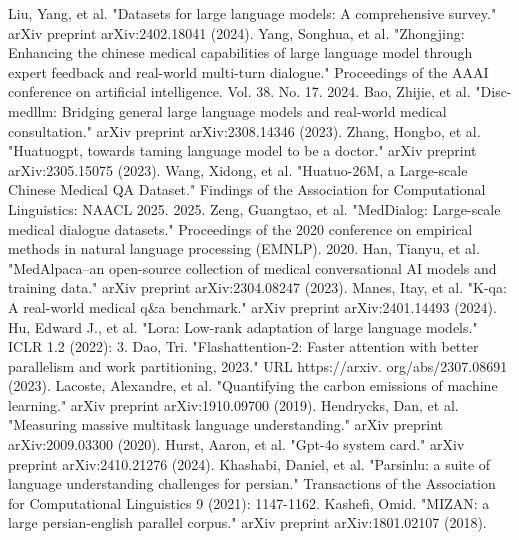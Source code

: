 \documentclass[conference]{IEEEtran}
\begin{document}
\begin{thebibliography}{00}
Liu, Yang, et al. "Datasets for large language models: A comprehensive survey." arXiv preprint arXiv:2402.18041 (2024).
Yang, Songhua, et al. "Zhongjing: Enhancing the chinese medical capabilities of large language model through expert feedback and real-world multi-turn dialogue." Proceedings of the AAAI conference on artificial intelligence. Vol. 38. No. 17. 2024.
Bao, Zhijie, et al. "Disc-medllm: Bridging general large language models and real-world medical consultation." arXiv preprint arXiv:2308.14346 (2023).
Zhang, Hongbo, et al. "Huatuogpt, towards taming language model to be a doctor." arXiv preprint arXiv:2305.15075 (2023).
Wang, Xidong, et al. "Huatuo-26M, a Large-scale Chinese Medical QA Dataset." Findings of the Association for Computational Linguistics: NAACL 2025. 2025.
Zeng, Guangtao, et al. "MedDialog: Large-scale medical dialogue datasets." Proceedings of the 2020 conference on empirical methods in natural language processing (EMNLP). 2020.
Han, Tianyu, et al. "MedAlpaca--an open-source collection of medical conversational AI models and training data." arXiv preprint arXiv:2304.08247 (2023).
Manes, Itay, et al. "K-qa: A real-world medical q\&a benchmark." arXiv preprint arXiv:2401.14493 (2024).
Hu, Edward J., et al. "Lora: Low-rank adaptation of large language models." ICLR 1.2 (2022): 3.
Dao, Tri. "Flashattention-2: Faster attention with better parallelism and work partitioning, 2023." URL https://arxiv. org/abs/2307.08691 (2023).
Lacoste, Alexandre, et al. "Quantifying the carbon emissions of machine learning." arXiv preprint arXiv:1910.09700 (2019).
Hendrycks, Dan, et al. "Measuring massive multitask language understanding." arXiv preprint arXiv:2009.03300 (2020).
Hurst, Aaron, et al. "Gpt-4o system card." arXiv preprint arXiv:2410.21276 (2024).
Khashabi, Daniel, et al. "Parsinlu: a suite of language understanding challenges for persian." Transactions of the Association for Computational Linguistics 9 (2021): 1147-1162.
Kashefi, Omid. "MIZAN: a large persian-english parallel corpus." arXiv preprint arXiv:1801.02107 (2018).
\end{thebibliography}
\end{document}
